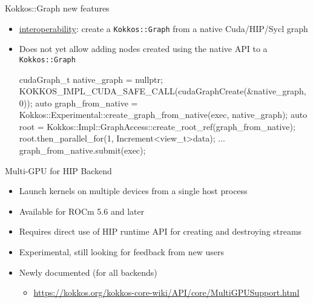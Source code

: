 \begin{frame}[fragile]{Kokkos::Graph new features}
 \begin{itemize}
   \item \href{https://github.com/kokkos/kokkos/pull/7664}{interoperability}: create a \texttt{Kokkos::Graph} from a native Cuda/HIP/Sycl graph
   \item Does not yet allow adding nodes created using the native API to a \texttt{Kokkos::Graph}
     \begin{code}[keywords={create_graph_from_native}]
cudaGraph_t native_graph = nullptr;
KOKKOS_IMPL_CUDA_SAFE_CALL(cudaGraphCreate(&native_graph, 0));
auto graph_from_native =
  Kokkos::Experimental::create_graph_from_native(exec, native_graph);
auto root = Kokkos::Impl::GraphAccess::create_root_ref(graph_from_native);
root.then_parallel_for(1, Increment<view_t>{data});
...
graph_from_native.submit(exec);
     \end{code}
 \end{itemize}
\end{frame}





\begin{frame}[fragile]{Multi-GPU for HIP Backend}
  \begin{itemize}
    \item Launch kernels on multiple devices from a single host process
    \item Available for ROCm 5.6 and later
    \item Requires direct use of HIP runtime API for creating and destroying streams
    \item Experimental, still looking for feedback from new users
    \item Newly documented (for all backends)  
      \begin{itemize} 
        \item[] \url{https://kokkos.org/kokkos-core-wiki/API/core/MultiGPUSupport.html}
      \end{itemize}
  \end{itemize}
\end{frame}

